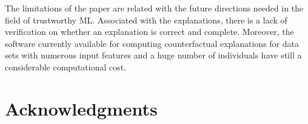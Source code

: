 \documentclass[letterpaper]{article} %
\begin{document}
The limitations of the paper are related with the future directions needed in the field of trustworthy ML. Associated with the explanations, there is a lack of verification on whether an explanation is correct and complete. 
Moreover, the software currently available for computing counterfactual explanations for data sets with numerous input features and a huge number of individuals have still a considerable computational cost.

\section{Acknowledgments}

%

\end{document}
